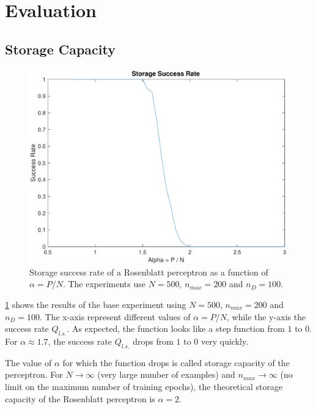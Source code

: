 \section{Evaluation}
\label{sec:evaluation}

\subsection{Storage Capacity}
\label{subsec:capacity}
\begin{figure}[t]
	\centering
	\includegraphics[width=\columnwidth]{figures/base}
    \caption{Storage success rate of a Rosenblatt perceptron as a function of $\alpha = P / N$. The experiments use $N = 500$, $n_{max} = 200$ and $n_D = 100$.}
	\label{fig:base}
\end{figure}

\cref{fig:base} shows the results of the base experiment using $N = 500$, $n_{max} = 200$ and $n_D = 100$.
The x-axis represent different values of $\alpha = P / N$, while the y-axis the success rate $Q_{l.s.}$.
As expected, the function looks like a step function from $1$ to $0$.
For $\alpha \approx 1.7$, the success rate $Q_{l.s.}$ drops from $1$ to $0$ very quickly. 

The value of $\alpha$ for which the function drops is called storage capacity of the perceptron.
For $N \to \infty$ (very large number of examples) and $n_{max} \to \infty$ (no limit on the maximum number of training epochs), the theoretical storage capacity of the Rosenblatt perceptron is $\alpha = 2$.

